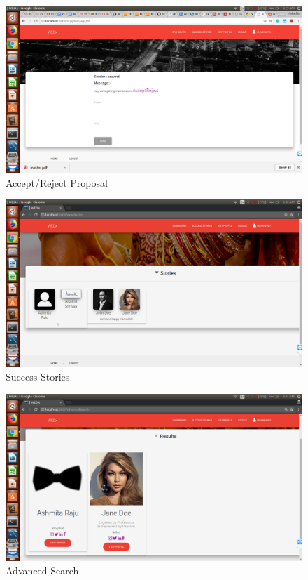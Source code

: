 \documentclass[12pt]{report}
\begin{document}
\begin{figure}[!htb]
    \centering
    \includegraphics[width=1\textwidth]{sc-22.png}
    \caption{Accept/Reject Proposal}
    \label{fig:Accept/Reject Proposal}
\end{figure}

\begin{figure}[!htb]
    \centering
    \includegraphics[width=1\textwidth]{sc-23.png}
    \caption{Success Stories}
    \label{fig:Success Stories}
\end{figure}

\begin{figure}[!htb]
    \centering
    \includegraphics[width=1\textwidth]{sc-24.png}
    \caption{Advanced Search}
    \label{fig:Advanced Search}
\end{figure}
\end{document}
